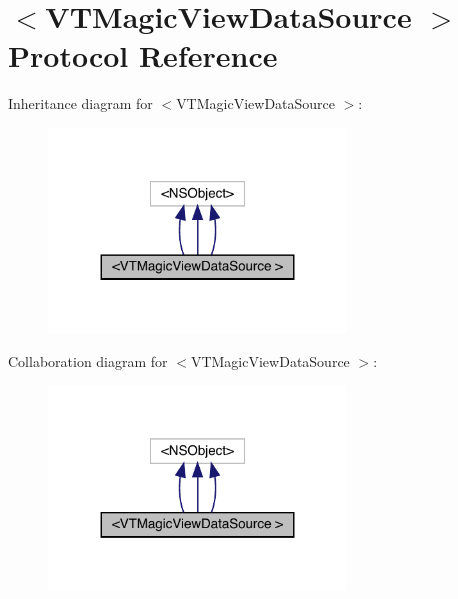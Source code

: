 \hypertarget{protocol_v_t_magic_view_data_source_01-p}{}\section{$<$V\+T\+Magic\+View\+Data\+Source $>$ Protocol Reference}
\label{protocol_v_t_magic_view_data_source_01-p}


Inheritance diagram for $<$V\+T\+Magic\+View\+Data\+Source $>$\+:\nopagebreak
\begin{figure}[H]
\begin{center}
\leavevmode
\includegraphics[width=224pt]{protocol_v_t_magic_view_data_source_01-p__inherit__graph}
\end{center}
\end{figure}


Collaboration diagram for $<$V\+T\+Magic\+View\+Data\+Source $>$\+:\nopagebreak
\begin{figure}[H]
\begin{center}
\leavevmode
\includegraphics[width=224pt]{protocol_v_t_magic_view_data_source_01-p__coll__graph}
\end{center}
\end{figure}
